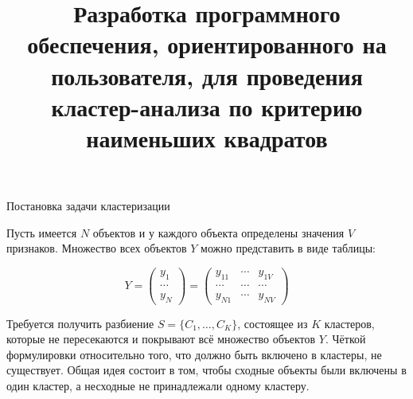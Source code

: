 \documentclass[aspectratio=169,tikz]{beamer}
\title{Разработка программного обеспечения, ориентированного на пользователя, для проведения кластер-анализа по критерию наименьших квадратов}
\author[Еремейкин П.А. \& Миркин Б.Г.]{
	\texorpdfstring{
	\begin{columns}
		\column{.45\linewidth}
		\raggedleft
		\begin{flushleft}
			Выполнил:\\
			Еремейкин Пётр Александрович\\
			студент группы мНоД16-ТМСС\\
			\href{mailto:eremeykin@gmail.com}{\texttt{eremeykin@gmail.com}}
		\end{flushleft}
		\column{.45\linewidth}
		\begin{flushright}
			Руководитель:\\
			Миркин Борис Григорьевич\\
			д.т.н., профессор\\
			\vspace*{1\baselineskip} 
		\end{flushright}
	\end{columns}
	}
	{Еремейкин \& Миркин}
}
\institute{\vspace{1cm} НИУ ВШЭ\\Июнь 2018}
\date{}
\begin{document}
	\usetikzlibrary{shapes,backgrounds}
	\usetikzlibrary{arrows.meta}
	\usetikzlibrary{snakes}
	
	\begin{frame}
		\titlepage
	\end{frame}
	
	\begin{frame}{Постановка задачи кластеризации}
		\parbox{\linewidth}{
				Пусть имеется $ N $ объектов и у каждого объекта определены значения $ V $ признаков. Множество всех объектов $ Y $ можно представить в виде таблицы:
			}
		\begin{equation*}
			Y= \begin{pmatrix} 
			y_{1} \\
			\cdots \\ 
			y_{N} 
			\end{pmatrix}
			= \begin{pmatrix} 
			y_{11} & \cdots  & y_{1V} \\ 
			\cdots & \cdots  & \cdots \\ 
			y_{N1} & \cdots  & y_{NV} 
			\end{pmatrix}
		\end{equation*}
		\parbox{\linewidth}{
			Требуется получить разбиение $ S = \{C_1,\ldots,C_K\} $, состоящее из $ K $ кластеров, которые не пересекаются и 	покрывают всё множество объектов $ Y $. Чёткой формулировки относительно того, что должно быть включено в кластеры, не существует.  Общая идея состоит в том, чтобы сходные объекты были включены в один кластер, а несходные не принадлежали одному кластеру.
		}

		
	\end{frame}
	
\end{document}
